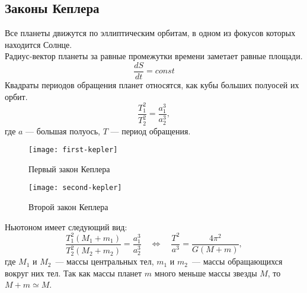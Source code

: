\subsection{Законы Кеплера}
 Все планеты движутся по 
эллиптическим орбитам, в одном из фокусов которых 
находится Солнце.\\

 Радиус-вектор планеты за 
равные промежутки времени заметает равные площади.
\begin{equation}
\frac{dS}{dt}=const
\end{equation}
 Квадраты периодов обращения планет 
относятся, как кубы больших полуосей их орбит.
\begin{equation}
\frac{T^2_1}{T^2_2}=\frac{a^3_1}{a^3_2},
\end{equation}
где $a$ --- большая полуось, $T$ --- период обращения.\\

\begin{figure}[h!]
\begin{minipage}[b]{0.5\textwidth}
\centering
\texttt{[image: first-kepler]}
\caption{Первый закон Кеплера}
\end{minipage}
\begin{minipage}[b]{0.5\textwidth}
\centering
\texttt{[image: second-kepler]}
\caption {Второй закон Кеплера}
\end{minipage}
\end{figure}

 Ньютоном  имеет следующий вид:
\begin{equation}
\frac{T^2_1( M_1 + m_1)}{T^2_2( M_2 + m_2 )}=\frac{a^3_1}{a^3_2} \quad \Longleftrightarrow \quad 
	\frac{T^2}{a^3} = \frac{4 \pi^2}{G ( M + m )},
\end{equation}
где $M_1$ и $M_2$~--- массы центральных тел, $m_1$ и 
$m_2$~--- массы обращающихся вокруг них тел. Так как массы планет 
$m$ много меньше массы звезды $M$, то $M + m \simeq M$.
